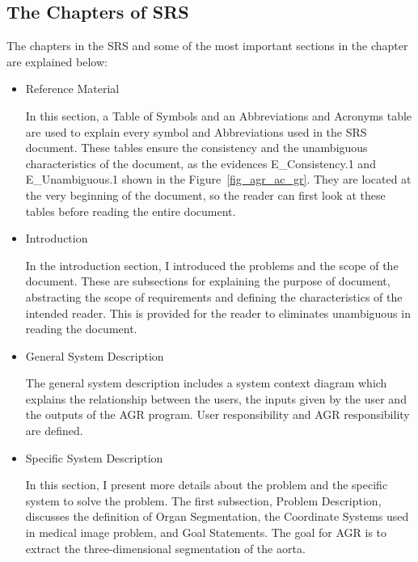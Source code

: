\subsection{The Chapters of SRS}
The chapters in the SRS and some of the most important sections in the chapter are explained below:
\begin{itemize}
\item Reference Material

In this section, a Table of Symbols and an Abbreviations and Acronyms table are used to explain every symbol and Abbreviations used in the SRS document. These tables ensure the consistency and the unambiguous characteristics of the document, as the evidences E\_Consistency.1 and E\_Unambiguous.1 shown in the Figure~\ref{fig_agr_ac_gr}. They are located at the very beginning of the document, so the reader can first look at these tables before reading the entire document. 

\item Introduction

In the introduction section, I introduced the problems and the scope of the document.  These are subsections for explaining the purpose of document, abstracting the scope of requirements and defining the characteristics of the intended reader. This is provided for the reader to eliminates unambiguous in reading the document.

\item General System Description

The general system description includes a system context diagram which explains the relationship between the users, the inputs given by the user and the outputs of the AGR program. User responsibility and AGR responsibility are defined.

\item Specific System Description

In this section, I present more details about the problem and the specific system to solve the problem. The first subsection, Problem Description, discusses the definition of Organ Segmentation, the Coordinate Systems used in medical image problem, and Goal Statements. The goal for AGR is to extract the three-dimensional segmentation of the aorta.


\end{itemize}
